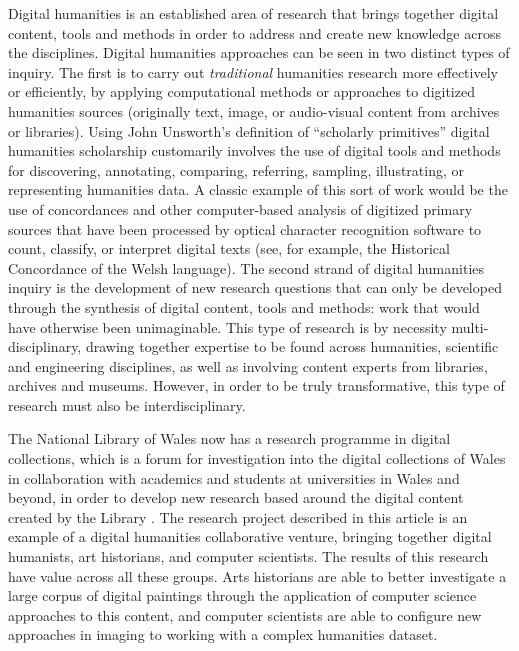 Digital humanities is an established area of research that brings together
digital content, tools and methods in order to address and create new knowledge
across the disciplines. Digital humanities approaches can be seen in two
distinct types of inquiry. The first is to carry out \emph{traditional}
humanities research more effectively or efficiently, by applying computational
methods or approaches to digitized humanities sources (originally text, image,
or audio-visual content from archives or libraries). Using John Unsworth’s
definition of ``scholarly primitives''\cite{Unsworth2000Scholarly} digital humanities
scholarship customarily involves the use of digital tools and methods for
discovering, annotating, comparing, referring, sampling, illustrating, or
representing humanities data. A classic example of this sort of work would be
the use of concordances and other computer-based analysis of digitized primary
sources that have been processed by optical character recognition software to
count, classify, or interpret digital texts (see, for example, the Historical
Concordance of the Welsh language\cite{2004Corpws}).  The second strand
of digital humanities inquiry is the development of new research questions that
can only be developed through the synthesis of digital content, tools and
methods: work that would have otherwise been unimaginable\cite{Hughes2011Evaluating}. This
type of research is by necessity multi-disciplinary, drawing together expertise
to be found across humanities, scientific and engineering disciplines, as well
as involving content experts from libraries, archives and museums. However, in
order to be truly transformative, this type of research must also be
interdisciplinary. 

The National Library of Wales now has a research programme in digital
collections, which is a forum for investigation into the digital collections of
Wales in collaboration with academics and students at universities in Wales and
beyond, in order to develop new research based around the digital content
created by the Library \cite{2012Research}. The research project described in this
article is an example of a digital humanities collaborative venture, bringing
together digital humanists, art historians, and computer scientists.  The
results of this research have value across all these groups. Arts historians
are able to better investigate a large corpus of digital paintings through the
application of computer science approaches to this content, and computer
scientists are able to configure new approaches in imaging to working with a
complex humanities dataset.

